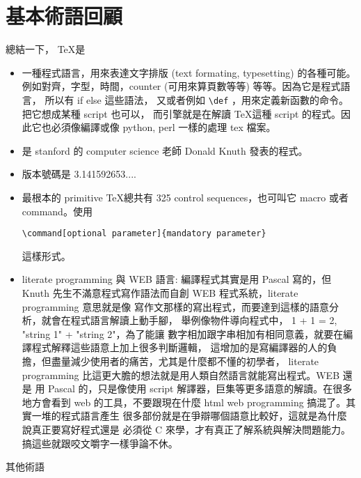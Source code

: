 \section{基本術語回顧}
總結一下， \TeX 是
\begin{itemize}
\item 一種程式語言，用來表達文字排版 (text formating, typesetting) 的各種可能。
例如對齊，字型，時間，counter (可用來算頁數等等) 等等。因為它是程式語言，
所以有 if else 這些語法，
又或者例如 \verb=\def= ，用來定義新函數的命令。 把它想成某種 script 也可以，
而引擎就是在解讀 \TeX 這種 script 的程式。因此它也必須像編譯或像 python, perl
一樣的處理 tex 檔案。
\item 是 stanford 的 computer science 老師 Donald Knuth 發表的程式。
\item 版本號碼是 3.141592653....
\item 最根本的 primitive \TeX 總共有 325 control sequences，也可叫它 macro 或者
 command。使用
\begin{verbatim}
\command[optional parameter]{mandatory parameter}
\end{verbatim}
這樣形式。
\item literate programming 與 WEB 語言: 編譯程式其實是用 Pascal 寫的，但 Knuth
先生不滿意程式寫作語法而自創 WEB 程式系統，literate programming 意思就是像
寫作文那樣的寫出程式，而要達到這樣的語意分析，就會在程式語言解讀上動手腳，
舉例像物件導向程式中， 1 + 1 = 2, "string 1" + "string 2"，為了能讓
數字相加跟字串相加有相同意義，就要在編譯程式解釋這些語意上加上很多判斷邏輯，
這增加的是寫編譯器的人的負擔，但盡量減少使用者的痛苦，尤其是什麼都不懂的初學者，
literate programming 比這更大膽的想法就是用人類自然語言就能寫出程式。WEB 還是
用 Pascal 的，只是像使用 script 解譯器，巨集等更多語意的解讀。在很多地方會看到
web 的工具，不要跟現在什麼 html web programming 搞混了。其實一堆的程式語言產生
很多部份就是在爭辯哪個語意比較好，這就是為什麼說真正要寫好程式還是
必須從 C 來學，才有真正了解系統與解決問題能力。搞這些就跟咬文嚼字一樣爭論不休。
\end{itemize}
其他術語
